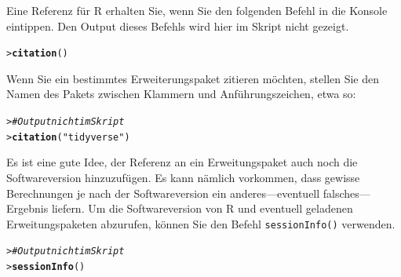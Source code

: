 \documentclass[oneside, 10pt]{book}\usepackage[]{graphicx}\usepackage[]{xcolor}
\makeatletter
\newcommand{\hlstr}[1]{\textcolor[rgb]{0.192,0.494,0.8}{#1}}%
\newcommand{\hlcom}[1]{\textcolor[rgb]{0.678,0.584,0.686}{\textit{#1}}}%
\newcommand{\hlstd}[1]{\textcolor[rgb]{0.345,0.345,0.345}{#1}}%
\newcommand{\hlkwd}[1]{\textcolor[rgb]{0.737,0.353,0.396}{\textbf{#1}}}%
\newenvironment{kframe}{%
 \def\at@end@of@kframe{}%
 \ifinner\ifhmode%
  \def\at@end@of@kframe{\end{minipage}}%
  \begin{minipage}{\columnwidth}%
 \fi\fi%
 \def\FrameCommand##1{\hskip\@totalleftmargin \hskip-\fboxsep
 \colorbox{shadecolor}{##1}\hskip-\fboxsep
     \hskip-\linewidth \hskip-\@totalleftmargin \hskip\columnwidth}%
 \MakeFramed {\advance\hsize-\width
   \@totalleftmargin\z@ \linewidth\hsize
   \@setminipage}}%
 {\par\unskip\endMakeFramed%
 \at@end@of@kframe}
\newenvironment{knitrout}{}{} %
\makeatother
\begin{document}
Eine Referenz für R erhalten Sie, wenn Sie 
den folgenden Befehl in die Konsole eintippen.
Den Output dieses Befehls wird hier im Skript nicht gezeigt.
\begin{knitrout}
\color{fgcolor}\begin{kframe}
\begin{alltt}
\hlstd{> }\hlkwd{citation}\hlstd{()}
\end{alltt}
\end{kframe}
\end{knitrout}

Wenn Sie ein bestimmtes Erweiterungspaket zitieren
möchten, stellen Sie den Namen des Pakets zwischen
Klammern und Anführungszeichen, etwa so:
\begin{knitrout}
\color{fgcolor}\begin{kframe}
\begin{alltt}
\hlstd{> }\hlcom{# Output nicht im Skript}
\hlstd{> }\hlkwd{citation}\hlstd{(}\hlstr{"tidyverse"}\hlstd{)}
\end{alltt}
\end{kframe}
\end{knitrout}

Es ist eine gute Idee, der Referenz an 
ein Erweitungspaket auch noch die Softwareversion 
hinzuzufügen. Es kann nämlich vorkommen, dass
gewisse Berechnungen je nach der Softwareversion
ein anderes---eventuell falsches---Ergebnis liefern.
Um die Softwareversion von R und eventuell geladenen
Erweitungspaketen abzurufen, können Sie den Befehl \texttt{sessionInfo()}
verwenden.
\begin{knitrout}
\color{fgcolor}\begin{kframe}
\begin{alltt}
\hlstd{> }\hlcom{# Output nicht im Skript}
\hlstd{> }\hlkwd{sessionInfo}\hlstd{()}
\end{alltt}
\end{kframe}
\end{knitrout}
% 
% 
% 
% 
\end{document}
